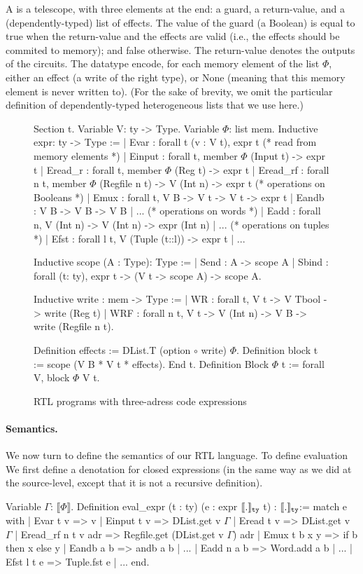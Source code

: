 \documentclass[preprint]{sigplanconf}
\newcommand{\denote}[1]{\llbracket #1 \rrbracket}
\begin{document}
A  is a telescope, with three elements at the end: a
guard, a return-value, and a (dependently-typed) list of effects. 
%
The value of the guard (a Boolean) is equal to true when the
return-value and the effects are valid (i.e., the effects should be
commited to memory); and false otherwise.
%
The return-value denotes the outputs of the circuits. 
%
The datatype  encode, for each memory element of the
list $\Phi$, either an effect (a write of the right type), or None
(meaning that this memory element is never written to). (For the sake
of brevity, we omit the particular definition of dependently-typed
heterogeneous lists  that we use here.)


\begin{figure}
  \centering
\begin{coq}
Section t. 
Variable V: ty -> Type. Variable $\Phi$: list mem. 
Inductive expr: ty -> Type :=
| Evar : forall t (v : V t), expr t
(* read from memory elements *)
| Einput : forall t, member $\Phi$ (Input t) -> expr t
| Eread_r : forall t, member $\Phi$ (Reg t) -> expr t
| Eread_rf : forall n t, member $\Phi$ (Regfile n t) -> V (Int n) -> expr t
(* operations on Booleans *)
| Emux : forall t, V B -> V t -> V t -> expr t
| Eandb : V B -> V B -> V B | ... 
(* operations on words *)
| Eadd : forall n, V (Int n) -> V (Int n) -> expr (Int n) | ... 
(* operations on tuples *)
| Efst : forall l t, V (Tuple (t::l)) -> expr t | ...

Inductive scope (A : Type): Type :=
| Send : A -> scope A
| Sbind : forall (t: ty), expr t -> (V t -> scope A) -> scope A. 

Inductive write : mem -> Type :=
| WR : forall t, V t -> V Tbool -> write (Reg t)
| WRF : forall n t, V t -> V (Int n) -> V B ->  write (Regfile n t). 
     
Definition effects := DList.T (option $\circ$ write) $\Phi$. 
Definition block t := scope (V B * V t *  effects).         
End t.
Definition Block $\Phi$ t := forall V, block $\Phi$ V t.
\end{coq}
  \caption{RTL programs with three-adress code expressions}
  \label{fig:rtl}
\end{figure}

\paragraph{Semantics.} We now turn to define the semantics of our RTL
language. 
%
To define  evaluation 
We first define a denotation for closed expressions (in the
same way as we did at the source-level, except that it is not a
recursive definition).
\begin{coq}
Variable $\Gamma$: $\denote{\Phi}$. 
Definition eval_expr (t : ty) (e : expr $\denotety{.}$ t) : $\denotety{.}$:=
match e with
| Evar t v => v
| Einput t v => DList.get v $\Gamma$
| Eread  t v =>  DList.get v $\Gamma$
| Eread_rf n t v adr => Regfile.get (DList.get v $\Gamma$) adr
| Emux t b x y => if b then x else y 
| Eandb a b => andb a b | ...
| Eadd n a b => Word.add a b  | ...
| Efst l t e => Tuple.fst e | ...
end. 
\end{coq}
\end{document}
